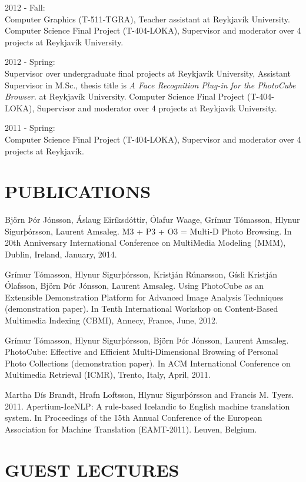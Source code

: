 \documentclass[margin]{res}
\begin{document}
\begin{resume}
2012 - Fall:\\ 
Computer Graphics (T-511-TGRA), Teacher assistant at Reykjavík University.
Computer Science Final Project (T-404-LOKA), Supervisor and moderator over 4
projects at Reykjavík University.

2012 - Spring:\\ 
Supervisor over undergraduate final projects at Reykjavík University, Assistant Supervisor in M.Sc., thesis title is \emph{A Face Recognition Plug-in for the PhotoCube Browser.} at Reykjavík University. Computer Science Final Project (T-404-LOKA), Supervisor and moderator over 4 projects at Reykjavík University.

2011 - Spring:\\ 
Computer Science Final Project (T-404-LOKA), Supervisor and moderator over 4 projects at Reykjavík.

\section{PUBLICATIONS}
Björn Þór Jónsson, Áslaug Eiríksdóttir, Ólafur Waage, Grímur Tómasson, Hlynur Sigurþórsson, Laurent Amsaleg. 
M3 + P3 + O3 = Multi-D Photo Browsing. 
In 20th Anniversary International Conference on MultiMedia Modeling (MMM), Dublin, Ireland, January, 2014.

Grímur Tómasson, Hlynur Sigurþórsson, Kristján Rúnarsson, Gísli Kristján Ólafsson, Björn Þór Jónsson, Laurent Amsaleg. 
Using PhotoCube as an Extensible Demonstration Platform for Advanced Image Analysis Techniques (demonstration paper). 
In Tenth International Workshop on Content-Based Multimedia Indexing (CBMI), Annecy, France, June, 2012.

Grímur Tómasson, Hlynur Sigurþórsson, Björn Þór Jónsson, Laurent Amsaleg. 
PhotoCube: Effective and Efficient Multi-Dimensional Browsing of Personal Photo Collections (demonstration paper). 
In ACM International Conference on Multimedia Retrieval (ICMR), Trento, Italy, April, 2011.

Martha Dís Brandt, Hrafn Loftsson, Hlynur Sigurþórsson and Francis M. Tyers. 2011. Apertium-IceNLP: A rule-based Icelandic to English machine translation system. In Proceedings of the 15th Annual Conference of the European Association for Machine Translation (EAMT-2011). Leuven, Belgium.


\section{GUEST LECTURES}


\end{resume}
\end{document}
